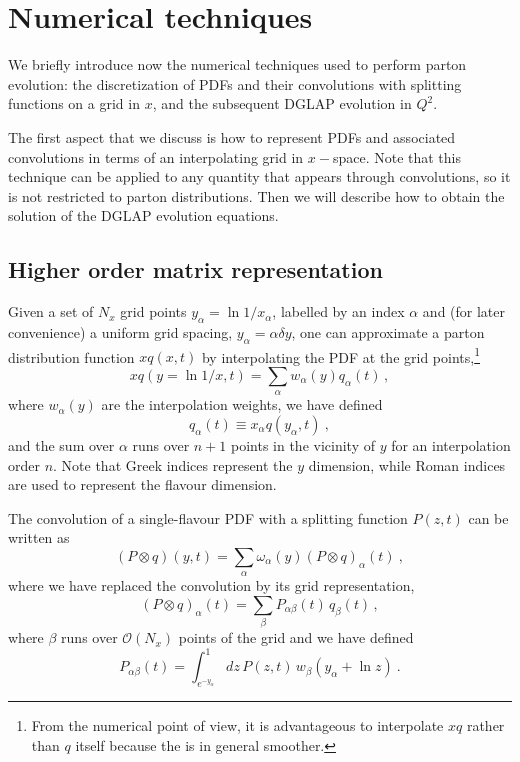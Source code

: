 \documentclass[12pt]{article}
\newcommand{\lp}{\left(}
\newcommand{\rp}{\right)}
\begin{document}
\section{Numerical techniques}
\label{tricks}
We briefly introduce now the numerical techniques used to perform
parton evolution: the discretization of PDFs and
their convolutions with splitting functions on a grid in $x$,
and the subsequent DGLAP evolution in $Q^2$. 

The first aspect that we discuss is how to represent PDFs
and associated convolutions in terms of an interpolating grid
in $x-$space.
Note that this technique can be applied to any quantity
that appears through convolutions, so it is not restricted
to parton distributions. Then we will describe how
to obtain the solution of the DGLAP evolution equations.

\subsection{Higher order matrix representation}
\label{sec:highord}


Given a set of $N_x$ grid points $y_\alpha=\ln 1/x_{\alpha}$, 
labelled by an
index $\alpha$ and
(for later convenience) a uniform grid spacing, $y_\alpha = \alpha \delta
y$, one can approximate a parton distribution function 
$xq \lp x,t \rp$ by
interpolating the PDF at the grid points,\footnote{From the 
numerical point of view, it is
advantageous to interpolate $xq$ rather than $q$ itself because
the is in general smoother.}
\begin{equation}
  xq(y=\ln 1/x,t) = \sum_\alpha w_\alpha(y) q_\alpha(t)\,,
\end{equation}
where $w_\alpha(y)$ are the interpolation weights, 
we have defined
\begin{equation}
 q_{\alpha}(t) \equiv
x_{\alpha}q(y_\alpha,t) \ ,
\end{equation}
and the sum over $\alpha$ runs over $n+1$ points in the
vicinity of $y$ for an interpolation order $n$. Note that Greek
indices represent the $y$ dimension, while  Roman indices
are  used to represent the flavour dimension.


The convolution of a single-flavour PDF with a splitting function
$P(z,t)$ can be written as
\begin{equation}
  (P \otimes q)(y,t) = \sum_{\alpha} \omega_{\alpha}(y)
 (P \otimes q)_\alpha(t) \ ,
\end{equation}
where we have replaced the convolution by its grid representation,
\begin{equation}
  (P \otimes q)_\alpha(t) = \sum_{\beta} P_{\alpha\beta}(t) \, q_\beta(t)\,,
\end{equation}
where $\beta$ runs over $\mathcal{O}\lp N_x \rp$ points of the grid and we have
defined
\begin{equation}
  \label{eq:Palphabeta}
  P_{\alpha\beta}(t) = \int_{e^{-y_{\alpha}}}^1 dz
 \,P(z,t)\, w_\beta(y_\alpha + \ln z)\  .
\end{equation}
\end{document}
